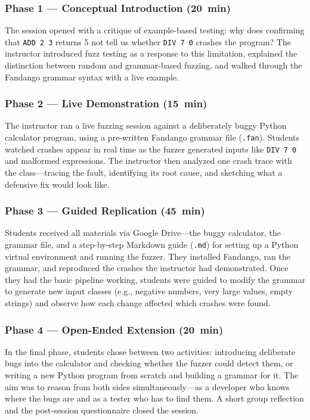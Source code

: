 \documentclass[conference]{IEEEtran}
\begin{document}
\subsubsection{Phase 1 --- Conceptual Introduction (20~min)}
The session opened with a critique of example-based testing: why does confirming that \texttt{ADD 2 3} returns 5 not tell us whether \texttt{DIV 7 0} crashes the program?
The instructor introduced fuzz testing as a response to this limitation, explained the distinction between random and grammar-based fuzzing, and walked through the Fandango grammar syntax with a live example.

\subsubsection{Phase 2 --- Live Demonstration (15~min)}
The instructor ran a live fuzzing session against a deliberately buggy Python calculator program, using a pre-written Fandango grammar file (\texttt{.fan}).
Students watched crashes appear in real time as the fuzzer generated inputs like \texttt{DIV 7 0} and malformed expressions.
The instructor then analyzed one crash trace with the class---tracing the fault, identifying its root cause, and sketching what a defensive fix would look like.

\subsubsection{Phase 3 --- Guided Replication (45~min)}
Students received all materials via Google Drive---the buggy calculator, the grammar file, and a step-by-step Markdown guide (\texttt{.md}) for setting up a Python virtual environment and running the fuzzer.
They installed Fandango, ran the grammar, and reproduced the crashes the instructor had demonstrated.
Once they had the basic pipeline working, students were guided to modify the grammar to generate new input classes (e.g., negative numbers, very large values, empty strings) and observe how each change affected which crashes were found.

\subsubsection{Phase 4 --- Open-Ended Extension (20~min)}
In the final phase, students chose between two activities: introducing deliberate bugs into the calculator and checking whether the fuzzer could detect them, or writing a new Python program from scratch and building a grammar for it.
The aim was to reason from both sides simultaneously---as a developer who knows where the bugs are and as a tester who has to find them.
A short group reflection and the post-session questionnaire closed the session.
\end{document}
